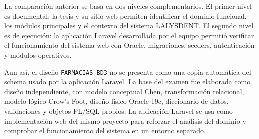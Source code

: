 La comparación anterior se basa en dos niveles complementarios. El primer nivel es documental: la tesis y su sitio web permiten identificar el dominio funcional, los módulos principales y el contexto del sistema LALYSDENT. El segundo nivel es de ejecución: la aplicación Laravel desarrollada por el equipo permitió verificar el funcionamiento del sistema web con Oracle, migraciones, seeders, autenticación y módulos operativos.

Aun así, el diseño \texttt{FARMACIAS\_BD3} no se presenta como una copia automática del schema usado por la aplicación Laravel. La base del examen fue elaborada como diseño independiente, con modelo conceptual Chen, transformación relacional, modelo lógico Crow's Foot, diseño físico Oracle 19c, diccionario de datos, validaciones y objetos PL/SQL propios. La aplicación Laravel se usa como implementación web del mismo proyecto para reforzar el análisis del dominio y comprobar el funcionamiento del sistema en un entorno separado.

